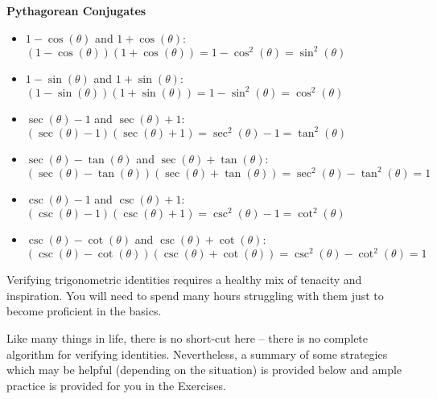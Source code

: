 \documentclass{ximera}
\begin{document}
\label{PythagoreanConjugates}
\smallskip
\colorbox{ResultColor}{\bbm

\smallskip

\centerline{\textbf{Pythagorean Conjugates}}  

\begin{itemize}

\item $1 - \cos(\theta)$ and  $1+\cos(\theta)$:  $(1-\cos(\theta))(1+\cos(\theta)) = 1 - \cos^{2}(\theta) = \sin^{2}(\theta)$

\item  $1-\sin(\theta)$ and $1 + \sin(\theta)$:  $(1-\sin(\theta))(1+\sin(\theta)) = 1 - \sin^{2}(\theta) = \cos^{2}(\theta)$

\item  $\sec(\theta)-1$ and $\sec(\theta)+1$:  $(\sec(\theta)-1)(\sec(\theta)+1) = \sec^{2}(\theta) - 1 =  \tan^{2}(\theta)$

\item  $\sec(\theta)-\tan(\theta)$ and $\sec(\theta)+\tan(\theta)$:  $(\sec(\theta)-\tan(\theta))(\sec(\theta)+\tan(\theta)) = \sec^{2}(\theta) - \tan^{2}(\theta) = 1$

\item  $\csc(\theta)-1$ and $\csc(\theta)+1$:  $(\csc(\theta)-1)(\csc(\theta)+1) = \csc^{2}(\theta) - 1 =  \cot^{2}(\theta)$

\item  $\csc(\theta)-\cot(\theta)$ and $\csc(\theta)+\cot(\theta)$:  $(\csc(\theta)-\cot(\theta))(\csc(\theta)+\cot(\theta)) = \csc^{2}(\theta) - \cot^{2}(\theta) = 1$

\smallskip

\end{itemize}

\ebm}


\smallskip

Verifying trigonometric identities requires a healthy mix of tenacity and inspiration.  You will need to spend many hours struggling with them just to become proficient in the basics. 

\smallskip

 Like many things in life, there is no short-cut here -- there is no complete algorithm for verifying identities.  Nevertheless, a summary of some strategies which  may be helpful (depending on the situation) is provided below and ample practice is provided for you in the Exercises.
 
 \smallskip
\end{document}
